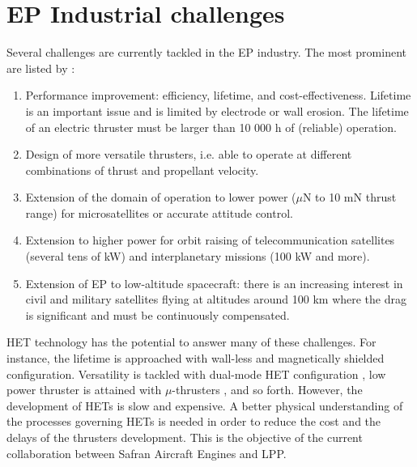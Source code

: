 
\section*{EP Industrial challenges}
\label{sec-challenges}

Several challenges are currently tackled in the \ac{EP} industry.
The most prominent are listed by \citet{samukawa2012}\string:
\begin{enumerate}
  \item Performance improvement\string: efficiency, lifetime, and cost-effectiveness.
   Lifetime is an important issue and is limited by electrode or wall erosion.
   The lifetime of an electric thruster must be larger than 10 000 h of (reliable) operation.
   \item  Design of more versatile thrusters, i.e. able to operate at different combinations of thrust and propellant velocity.
   \item  Extension of the domain of operation to lower power ($\mu$N to 10 mN thrust range) for microsatellites or accurate attitude control.
   \item  Extension to higher power for orbit raising of telecommunication satellites (several tens of kW) and    interplanetary missions (100 kW and more).
   \item Extension of EP to low-altitude spacecraft\string: there is an increasing interest in civil and military satellites flying  at altitudes around 100 km where the drag is significant and must be continuously compensated.
\end{enumerate}

\ac{HET} technology has the potential to answer many of these challenges.
For instance, the lifetime is approached with wall-less and magnetically shielded configuration.
Versatility is tackled with dual-mode \ac{HET} configuration \citep{boniface2017}, low power thruster is attained with $\mu$-thrusters \citep{lascombes2018}, and so forth.
However, the development of \ac{HET}s is slow and expensive. 
A better physical understanding of the processes governing \ac{HET}s is needed in order to reduce the cost and the delays of the thrusters development.
This is the objective of the current collaboration between Safran Aircraft Engines and \ac{LPP}.
